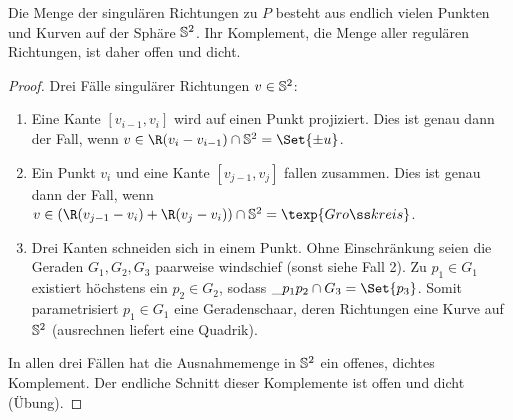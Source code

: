 \begin{lem}
    Die Menge der singulären Richtungen zu $P$ besteht aus endlich vielen Punkten und Kurven auf der Sphäre $\S^2$.
    Ihr Komplement, die Menge aller regulären Richtungen, ist daher offen und dicht.
    \begin{proof}
        Drei Fälle singulärer Richtungen $v \in \S^2$:
        \begin{enumerate}[(1)]
            \item
                Eine Kante $[v_{i-1},v_i]$ wird auf einen Punkt projiziert.
                Dies ist genau dann der Fall, wenn $v \in \R(v_i - v_{i-1}) \cap \S^2 = \Set{\pm u}$.
            \item
                Ein Punkt $v_i$ und eine Kante $[v_{j-1}, v_j]$ fallen zusammen.
                Dies ist genau dann der Fall, wenn $v \in (\R(v_{j-1} - v_i) + \R(v_j - v_i)) \cap \S^2 = \texp{Großkreis}$.
            \item
                Drei Kanten schneiden sich in einem Punkt.
                Ohne Einschränkung seien die Geraden $G_1, G_2, G_3$ paarweise windschief (sonst siehe Fall 2).
                Zu $p_1 \in G_1$ existiert höchstens ein $p_2 \in G_2$, sodass $\_{p_1 p_2} \cap G_3 = \Set{p_3}$.
                Somit parametrisiert $p_1 \in G_1$ eine Geradenschaar, deren Richtungen eine Kurve auf $\S^2$ (ausrechnen liefert eine Quadrik).
        \end{enumerate}
        In allen drei Fällen hat die Ausnahmemenge in $\S^2$ ein offenes, dichtes Komplement.
        Der endliche Schnitt dieser Komplemente ist offen und dicht (Übung).
    \end{proof}
\end{lem}

